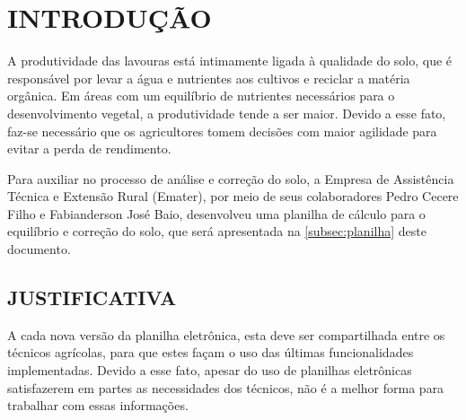 
\chapter{INTRODUÇÃO}
\label{chap:introducao}


A produtividade das lavouras está intimamente ligada à qualidade do solo, que é responsável por levar a água e nutrientes aos cultivos e reciclar a matéria orgânica. Em áreas com um equilíbrio de nutrientes necessários para o desenvolvimento vegetal, a produtividade tende a ser maior. Devido a esse fato, faz-se necessário que os agricultores tomem decisões com maior agilidade para evitar a perda de rendimento.


Para auxiliar no processo de análise e correção do solo, a Empresa de Assistência Técnica e Extensão Rural (Emater), por meio de seus colaboradores Pedro Cecere Filho e Fabianderson José Baio, desenvolveu uma planilha de cálculo para o equilíbrio e correção do solo, que será apresentada na \autoref{subsec:planilha} deste documento.

\section{JUSTIFICATIVA}
\label{sec:justificativa}

A cada nova versão da planilha eletrônica, esta deve ser compartilhada entre os técnicos agrícolas, para que estes façam o uso das últimas funcionalidades implementadas. Devido a esse fato, apesar do uso de planilhas eletrônicas satisfazerem em partes as necessidades dos técnicos, não é a melhor forma para trabalhar com essas informações.

